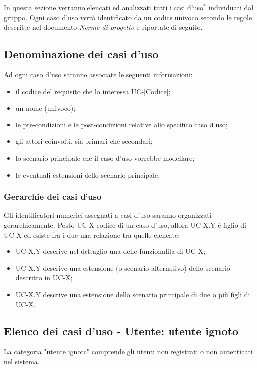 In questa sezione verranno elencati ed analizzati tutti i casi d'uso$^*$ individuati dal gruppo. Ogni caso d'uso verrà identificato da un codice univoco secondo le regole descritte nel documento \textit{Norme di progetto} e riportate di seguito. 
\subsection{Denominazione dei casi d'uso}
Ad ogni caso d'uso saranno associate le seguenti informazioni:
\begin{itemize}
\item il codice del requisito che lo interessa UC-[Codice];
\item un nome (univoco);
\item le pre-condizioni e le post-condizioni relative allo specifico caso d'uso;
\item gli attori coinvolti, sia primari che secondari;
\item lo scenario principale che il caso d'uso vorrebbe modellare;
\item le eventuali estensioni dello scenario principale.
\end{itemize}

\subsubsection{Gerarchie dei casi d'uso} 

Gli identificatori numerici assegnati a casi d'uso saranno organizzati gerarchicamente. Posto UC-X codice di un caso d'uso, allora UC-X.Y è figlio di UC-X ed esiste fra i due una relazione tra quelle elencate:
\begin{itemize}
\item UC-X.Y descrive nel dettaglio una delle funzionalita di UC-X;
\item UC-X.Y descrive una estensione (o scenario alternativo) dello scenario descritto in UC-X; 
\item UC-X.Y descrive una estensione dello scenario principale di due o più figli di UC-X.
\end{itemize}

\subsection{Elenco dei casi d'uso - Utente: utente ignoto}
La categoria "utente ignoto" comprende gli utenti non registrati o non autenticati nel sistema.

